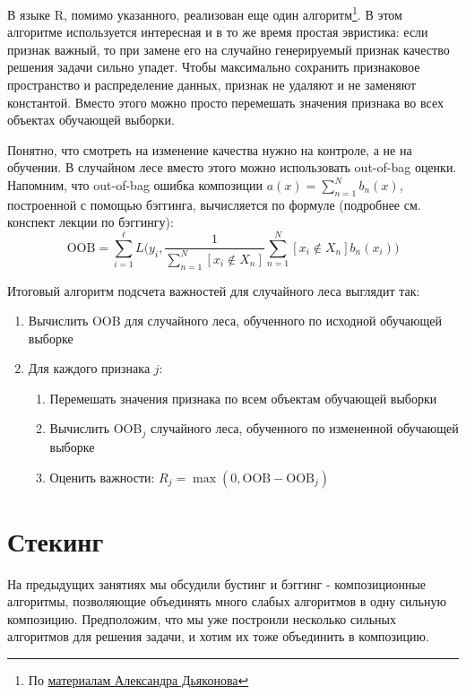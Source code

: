 \documentclass[12pt,a4paper]{article}
\begin{document}
     \par В языке R, помимо указанного, реализован еще один алгоритм\footnote{По \href{http://www.machinelearning.ru/wiki/images/c/cc/PZAD2016_09_rf.pdf}{материалам Александра Дьяконова}}. В этом алгоритме используется интересная и в то же время простая эвристика: если признак важный, то при замене его на случайно генерируемый признак качество решения задачи сильно упадет. Чтобы максимально сохранить признаковое пространство и распределение данных, признак не удаляют и не заменяют константой. Вместо этого можно просто перемешать значения признака во всех объектах обучающей выборки.
     
     Понятно, что смотреть на изменение качества нужно на контроле, а не на обучении. В случайном лесе вместо этого можно использовать  out-of-bag оценки. Напомним, что out-of-bag ошибка композиции $a(x) = \sum_{n=1}^N b_n(x)$, построенной с помощью бэггинга, вычисляется по формуле (подробнее см. конспект лекции по бэггингу):
     \[
     \text{OOB} = \sum_{i=1}^\ell L\biggl(y_i, \frac 1 {\sum_{n=1}^N [x_i \notin X_n]} \sum_{n=1}^N [x_i \notin X_n] b_n(x_i)\biggr)
     \]
     
     Итоговый алгоритм подсчета важностей для случайного леса выглядит так:
     \begin{enumerate}
     	\item Вычислить OOB для случайного леса, обученного по исходной обучающей выборке
     	\item Для каждого признака $j$:
     	\begin{enumerate}
     		\item Перемешать значения признака по всем объектам обучающей выборки
     		\item Вычислить OOB$_j$ случайного леса, обученного по измененной обучающей выборке
     		\item Оценить важности: $R_j = \max(0, \text{OOB}-\text{OOB}_j)$
     	\end{enumerate}
     \end{enumerate}
 
    \section{Стекинг}
    На предыдущих занятиях мы обсудили бустинг и бэггинг - композиционные алгоритмы, позволяющие объединять много слабых алгоритмов в одну сильную композицию. Предположим, что мы уже построили несколько сильных алгоритмов для решения задачи, и хотим их тоже объединить в композицию. 
    
\end{document}
